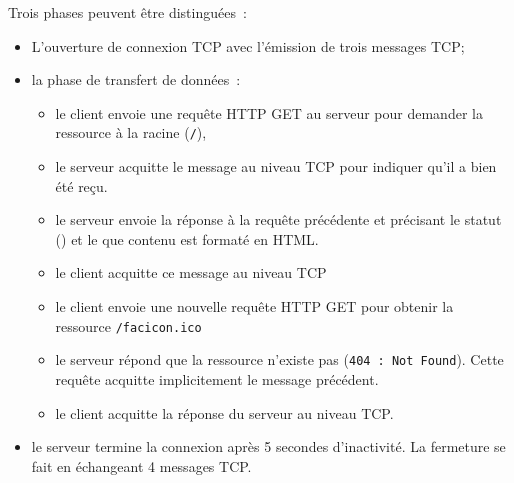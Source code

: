 Trois phases peuvent être distinguées~:
\begin{itemize}
    \item L'ouverture de connexion TCP avec l'émission de trois messages TCP;
    \item la phase de transfert de données~:
    \begin{itemize}
        \item le client envoie une requête HTTP GET au serveur pour demander la ressource à la racine (\texttt{/}),
        \item le serveur acquitte le message au niveau TCP pour indiquer qu'il a bien été reçu.
        \item le serveur envoie la réponse à la requête précédente et précisant le statut () et le que contenu est formaté en HTML.
        \item le client acquitte ce message au niveau TCP
        \item le client envoie une nouvelle requête HTTP GET pour obtenir la ressource \texttt{/facicon.ico}
        \item le serveur répond que la ressource n'existe pas (\texttt{404 : Not Found}). Cette requête acquitte implicitement le message précédent.
        \item le client acquitte la réponse du serveur au niveau TCP.
    \end{itemize}
    \item le serveur termine la connexion après 5 secondes d'inactivité. La fermeture se fait en échangeant 4 messages TCP.
\end{itemize}

